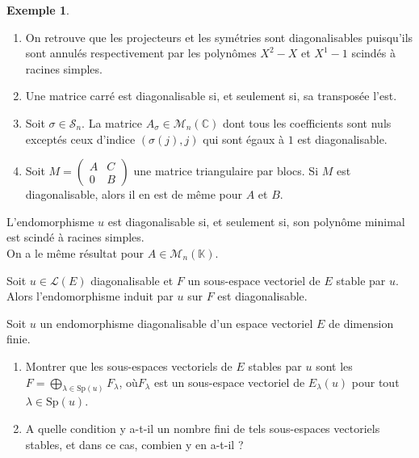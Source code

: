 \documentclass[french]{article}
\newcommand{\C}{\mathbb{C}}
\newcommand{\K}{\mathbb{K}}
\newcommand{\Sp}{\text{Sp}}
\theoremstyle{plain}
\theoremstyle{definition}
\newtheorem*{ex}{Exemple}
\theoremstyle{remark}
\begin{document}
	\begin{ex}
		\begin{enumerate}
			\item On retrouve que les projecteurs et les symétries sont diagonalisables puisqu'ils sont annulés respectivement par les polynômes $X^2-X$ et $X^1-1$ scindés à racines simples.
			\item Une matrice carré est diagonalisable si, et seulement si, sa transposée l'est.
			\item Soit $\sigma\in\mathcal{S}_n$. La matrice $A_{\sigma}\in\mathcal{M}_n(\C)$ dont tous les coefficients sont nuls exceptés ceux d'indice $(\sigma(j),j)$ qui sont égaux à $1$ est diagonalisable. %
			\item Soit $M=\begin{pmatrix}
				A&C\\
				0&B
			\end{pmatrix}$ une matrice triangulaire par blocs. Si $M$ est diagonalisable, alors il en est de même pour $A$ et $B$.
		\end{enumerate}
	\end{ex}
	
	\begin{cor}%
		L'endomorphisme $u$ est diagonalisable si, et seulement si, son polynôme minimal est scindé à racines simples.\\
		On a le même résultat pour $A\in\mathcal{M}_n(\K)$.
	\end{cor}
	
	\begin{prop}%
		Soit $u\in\mathcal{L}(E)$ diagonalisable et $F$ un sous-espace vectoriel de $E$ stable par $u$. Alors l'endomorphisme induit par $u$ sur $F$ est diagonalisable.
	\end{prop}
	
	\begin{exo}
		Soit $u$ un endomorphisme diagonalisable d'un espace vectoriel $E$ de dimension finie.
		\begin{enumerate}
			\item Montrer que les sous-espaces vectoriels de $E$ stables par $u$ sont les $F=\displaystyle\bigoplus_{\lambda\in\Sp(u)}F_\lambda$, où$F_\lambda$ est un sous-espace vectoriel de $E_\lambda(u)$ pour tout $\lambda\in\Sp(u)$.
			\item A quelle condition y a-t-il un nombre fini de tels sous-espaces vectoriels stables, et dans ce cas, combien y en a-t-il ?
		\end{enumerate}
	\end{exo}
	
\end{document}
